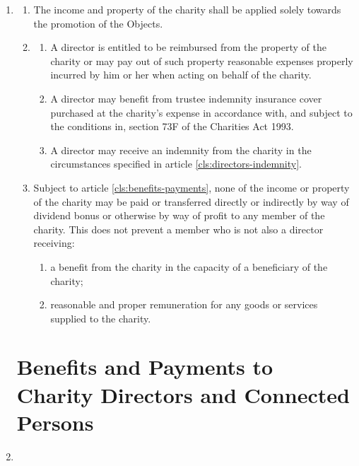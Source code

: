 \begin{enumerate}
\item
  \label{cls:income-property}
  \begin{enumerate}
  \item
    The income and property of the charity shall be applied solely
    towards the promotion of the Objects.
  \item
    \label{scls:director-reimburse}
    \begin{enumerate}
    \item
      A director is entitled to be reimbursed from the property of the
      charity or may pay out of such property reasonable expenses
      properly incurred by him or her when acting on behalf of the
      charity.
    \item
      A director may benefit from trustee indemnity insurance cover
      purchased at the charity's expense in accordance with, and subject
      to the conditions in, section 73F of the Charities Act 1993.
    \item
      A director may receive an indemnity from the charity in the
      circumstances specified in article \ref{cls:directors-indemnity}.
    \end{enumerate}
  \item
    Subject to article \ref{cls:benefits-payments}, none of the income or 
    property of the charity may be paid or
    transferred directly or indirectly by way of dividend bonus or
    otherwise by way of profit to any member of the charity. This does
    not prevent a member who is not also a director receiving:
    \begin{enumerate}
    \item
      a benefit from the charity in the capacity of a beneficiary of the
      charity;
    \item
      reasonable and proper remuneration for any goods or services
      supplied to the charity.
    \end{enumerate}
  \end{enumerate}

\section{Benefits and Payments to Charity Directors and Connected Persons}

\item

\end{enumerate}
